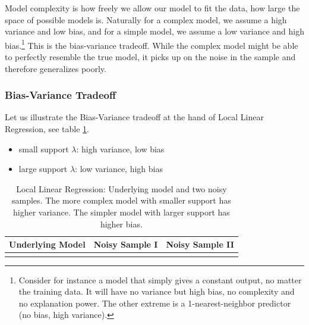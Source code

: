 Model complexity is how freely we allow our model to fit the data, how large the space of possible models is.
Naturally for a complex model, we assume a high variance and low bias, and for a simple model, we assume a low variance and high bias.\footnote{Consider for instance a model that simply gives a constant output, no matter the training data. It will have no variance but high bias, no complexity and no explanation power. The other extreme is a 1-nearest-neighbor predictor (no bias, high variance).}
This is the \textcolor{blue1}{bias-variance tradeoff}. While the complex model might be able to 
perfectly resemble the true model, it picks up on the noise in the sample and therefore generalizes poorly.

\subsubsection{Bias-Variance Tradeoff}

Let us illustrate the Bias-Variance tradeoff at the hand of Local Linear Regression,
see table \ref{tab:bias_variance_llr}.

\begin{itemize}
    \item small support $\lambda$: high variance, low bias
    \item large support $\lambda$: low variance, high bias
\end{itemize}

\begin{table}[H]
    \centering
    \begin{tabular}{c|c|c}
        \textbf{Underlying Model} & \textbf{Noisy Sample I} & \textbf{Noisy Sample II} \\
        \hline
         &
         &
        
        \\
        \hline
    \end{tabular}
    \caption{Local Linear Regression: Underlying model and two noisy samples. The more complex model
    with smaller support has higher variance. The simpler model with larger support has higher bias.}
    \label{tab:bias_variance_llr}
\end{table}

